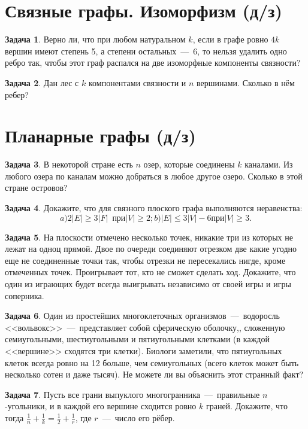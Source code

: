 \documentclass[12pt,a4paper,fleqn]{article}
\theoremstyle{definition}
\newtheorem{exersize}{Задача}[section]
\begin{document}
\newpage
\section{Связные графы. Изоморфизм (д/з)}
\begin{exersize}
	Верно ли, что при любом натуральном $k$, если в графе ровно $4k$ вершин имеют степень 5, а степени остальных~---~6, то нельзя удалить одно ребро так, чтобы этот граф распался на две изоморфные компоненты связности?
\end{exersize}
\begin{exersize}
	Дан лес с $k$ компонентами связности и $n$ вершинами. Сколько в нём ребер?
\end{exersize}

\newpage
\section{Планарные графы (д/з)}
\begin{exersize}
	В некоторой стране есть $n$ озер, которые соединены $k$ каналами. Из любого озера по каналам можно добраться в любое другое озеро. Сколько в этой стране островов?
\end{exersize}
\begin{exersize}
	Докажите, что для связного плоского графа выполняются неравенства:
	$$a) 2|E| \geqslant 3|F| \;\ \text{при} |V| \geqslant 2; b) |E| \leqslant 3|V| - 6 \text{при} |V| \geqslant 3.$$
\end{exersize}
\begin{exersize}
	На плоскости отмечено несколько точек, никакие три из которых не лежат на одноц прямой. Двое по очереди соединяют отрезком две какие угодно еще не соединенные точки так, чтобы отрезки не пересекались нигде, кроме отмеченных точек. Проигрывает тот, кто не сможет сделать ход. Докажите, что один из играющих будет всегда выигрывать независимо от своей игры и игры соперника.
\end{exersize}
\begin{exersize}
	Один из простейших многоклеточных организмов~---~водоросль <<вольвокс>>~---~представляет собой сферическую оболочку,, сложенную семиугольными, шестиугольными и пятиугольными клетками (в каждой <<вершине>> сходятся три клетки). Биологи заметили, что пятиугольных клеток всегда ровно на 12 больше, чем семиугольных (всего клеток может быть несколько сотен и даже тысяч). Не можете ли вы объяснить этот странный факт?
\end{exersize}
\begin{exersize}
	Пусть все грани выпуклого многогранника~---~правильные $n$-угольники, и в каждой его вершине сходится ровно $k$ граней. Докажите, что тогда $\frac{1}{n} + \frac{1}{k} = \frac{1}{2} + \frac{1}{r}$, где $r$~---~число его рёбер.
\end{exersize}
\end{document}
